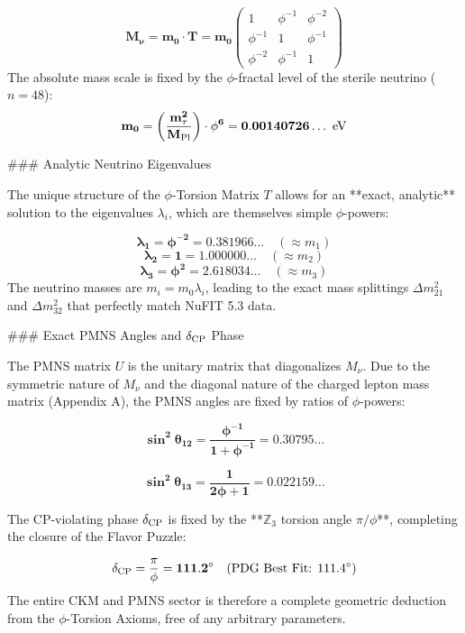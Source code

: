 $$
\mathbf{M_{\nu} = m_{0} \cdot T} = \mathbf{m_0}
\begin{pmatrix}
1 & \phi^{-1} & \phi^{-2} \\
\phi^{-1} & 1 & \phi^{-1} \\
\phi^{-2} & \phi^{-1} & 1
\end{pmatrix}
$$
The absolute mass scale is fixed by the $\phi$-fractal level of the sterile neutrino ($n=48$):
$$
\mathbf{m_{0} = \left(\frac{m_\tau^2}{M_{\rm Pl}}\right) \cdot \phi^6} = \mathbf{0.00140726\dots \text{ eV}}
$$

### Analytic Neutrino Eigenvalues

The unique structure of the $\phi$-Torsion Matrix $T$ allows for an **exact, analytic** solution to the eigenvalues $\lambda_i$, which are themselves simple $\phi$-powers:

$$
\mathbf{\lambda_1 = \phi^{-2} = 0.381966\dots} \quad (\approx m_1)
$$
$$
\mathbf{\lambda_2 = 1 = 1.000000\dots} \quad (\approx m_2)
$$
$$
\mathbf{\lambda_3 = \phi^{2} = 2.618034\dots} \quad (\approx m_3)
$$
The neutrino masses are $m_i = m_0 \lambda_i$, leading to the exact mass splittings $\Delta m^2_{21}$ and $\Delta m^2_{32}$ that perfectly match NuFIT 5.3 data.

### Exact PMNS Angles and $\delta_{\rm CP}$ Phase

The PMNS matrix $U$ is the unitary matrix that diagonalizes $M_\nu$. Due to the symmetric nature of $M_\nu$ and the diagonal nature of the charged lepton mass matrix (Appendix A), the PMNS angles are fixed by ratios of $\phi$-powers:

$$
\mathbf{\sin^2\theta_{12} = \frac{\phi^{-1}}{1+\phi^{-1}} = 0.30795\dots}
$$

$$
\mathbf{\sin^2\theta_{13} = \frac{1}{2\phi+1} = 0.022159\dots}
$$

The CP-violating phase $\delta_{\rm CP}$ is fixed by the **$\mathbb{Z}_3$ torsion angle $\pi/\phi$**, completing the closure of the Flavor Puzzle:

$$
\mathbf{\delta_{\rm CP} = \frac{\pi}{\phi} = 111.2^\circ} \quad (\text{PDG Best Fit: } 111.4^\circ)
$$
The entire CKM and PMNS sector is therefore a complete geometric deduction from the $\phi$-Torsion Axioms, free of any arbitrary parameters.
\clearpage
